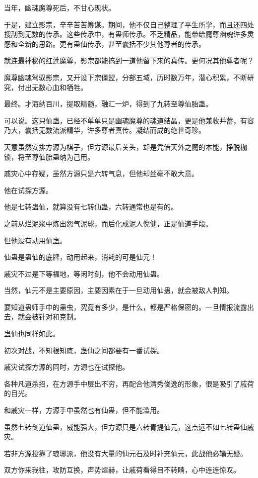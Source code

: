 \begin{this_body}
当年，幽魂魔尊死后，不甘心现状。

于是，建立影宗，辛辛苦苦筹谋。期间，他不仅自己整理了平生所学，而且还四处搜刮到无数的传承。这些传承中，有蛊师传承。不乏精品，能带给魔尊幽魂许多灵感和全新的思路。更有蛊仙传承，甚至囊括不少其他尊者的传承。

就连最神秘的红莲魔尊，影宗都能搞到一道他留下来的真传。更何况其他尊者呢？

魔尊幽魂驾驭影宗，又开设下宗僵盟，分部五域，历时数万年，潜心积累，不断研究，付出无数心血和牺牲。

最终。才海纳百川，提取精髓，融汇一炉，得到了九转至尊仙胎蛊。

可以说。这只仙蛊，已经不单单只是幽魂魔尊的魂道结晶，更是他兼收并蓄，有容乃大，囊括无数流派精华，许多尊者真传。凝结而成的绝世奇珍。

天意虽然安排方源为棋子，但方源最后关头，却是凭借天外之魔的本能，挣脱枷锁，将至尊仙胎蛊纳为己用。

戚灾心中存疑，虽然方源只是六转气息，但他却丝毫不敢大意。

他在试探方源。

他是七转蛊仙，就算没有七转仙蛊，六转通常也是有的。

之前从烂泥浆中炼出怨气泥球，而后化成泥人倪健，正是仙道手段。

但他没有动用仙蛊。

仙蛊是蛊仙的底牌，动用起来，消耗的可是仙元！

戚灾不过是下等福地，等闲时刻，他不会动用仙蛊。

当然，仙元不是主要原因，主要因素在于一旦动用仙蛊，就会被敌人判知。

要知道蛊师手中的蛊虫，究竟有多少，是什么，都是严格保密的。一旦情报流露出去，就会被针对和克制。

蛊仙也同样如此。

初次对战，不知根知底，蛊仙之间都要有一番试探。

戚灾试探方源的同时，方源也在试探他。

各种凡道杀招，在方源手中层出不穷，再配合他清秀俊逸的形象，很是吸引了戚荷的目光。

和戚灾一样，方源手中虽然也有仙蛊，但不能滥用。

虽然七转剑道仙蛊，威能强大，但方源只是六转青提仙元，这点远不如七转蛊仙戚灾。

若非方源投靠了琅琊派，他没有大量的仙元石及时补充仙元，此战他必输无疑。

双方你来我往，攻防互换，声势煊赫，让戚荷看得目不转睛，心中连连惊叹。


\end{this_body}
